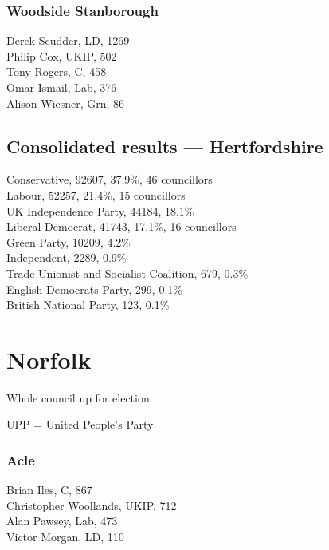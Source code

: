 \documentclass[a4paper,openany,10pt]{book}
\begin{document}
\subsubsection*{Woodside Stanborough}



Derek Scudder, LD, 1269\\
Philip Cox, UKIP, 502\\
Tony Rogers, C, 458\\
Omar Ismail, Lab, 376\\
Alison Wiesner, Grn, 86\\




\subsection*{Consolidated results --- Hertfordshire}
Conservative, 92607, 37.9\%, 46 councillors\\
Labour, 52257, 21.4\%, 15 councillors\\
UK Independence Party, 44184, 18.1\% \\
Liberal Democrat, 41743, 17.1\%, 16 councillors\\
Green Party, 10209, 4.2\% \\
Independent, 2289, 0.9\% \\
Trade Unionist and Socialist Coalition, 679, 0.3\% \\
English Democrats Party, 299, 0.1\% \\
British National Party, 123, 0.1\% \\


\vfill

\section{Norfolk}

Whole council up for election.

UPP = United People's Party



\subsubsection*{Acle}



Brian Iles, C, 867\\
Christopher Woollands, UKIP, 712\\
Alan Pawsey, Lab, 473\\
Victor Morgan, LD, 110\\
\end{document}
